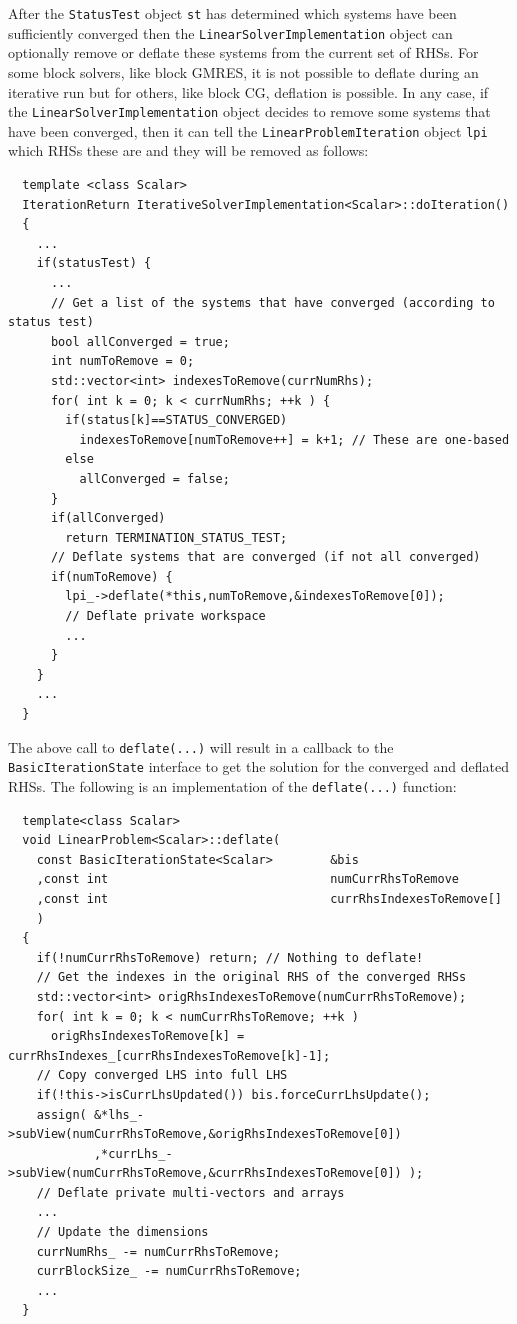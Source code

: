 \documentclass[pdf,ps2pdf,11pt]{SANDreport}
\begin{document}
\begin{enumerate}
After the {}\texttt{Status\-Test} object {}\texttt{st} has determined
which systems have been sufficiently converged then the
{}\texttt{Linear\-Solver\-Implementation} object can optionally remove
or deflate these systems from the current set of RHSs.  For some block
solvers, like block GMRES, it is not possible to deflate during an
iterative run but for others, like block CG, deflation is possible.
In any case, if the {}\texttt{Linear\-Solver\-Implementation} object
decides to remove some systems that have been converged, then it can
tell the {}\texttt{Linear\-Problem\-Iteration} object {}\texttt{lpi}
which RHSs these are and they will be removed as follows:

{\scriptsize\begin{verbatim}
  template <class Scalar>
  IterationReturn IterativeSolverImplementation<Scalar>::doIteration()
  {
    ...
    if(statusTest) {
      ...
      // Get a list of the systems that have converged (according to status test)
      bool allConverged = true;
      int numToRemove = 0;
      std::vector<int> indexesToRemove(currNumRhs);
      for( int k = 0; k < currNumRhs; ++k ) {
        if(status[k]==STATUS_CONVERGED)
          indexesToRemove[numToRemove++] = k+1; // These are one-based
        else
          allConverged = false;
      }
      if(allConverged)
        return TERMINATION_STATUS_TEST;
      // Deflate systems that are converged (if not all converged)
      if(numToRemove) {
        lpi_->deflate(*this,numToRemove,&indexesToRemove[0]);
        // Deflate private workspace
        ...
      }
    }
    ...
  }
\end{verbatim}}

The above call to {}\texttt{deflate(...)} will result in a callback to
the {}\texttt{Basic\-Iteration\-State} interface to get the solution
for the converged and deflated RHSs.  The following is an
implementation of the {}\texttt{deflate(...)} function:

{\scriptsize\begin{verbatim}
  template<class Scalar>
  void LinearProblem<Scalar>::deflate(
    const BasicIterationState<Scalar>        &bis
    ,const int                               numCurrRhsToRemove
    ,const int                               currRhsIndexesToRemove[]
    )
  {
    if(!numCurrRhsToRemove) return; // Nothing to deflate!
    // Get the indexes in the original RHS of the converged RHSs
    std::vector<int> origRhsIndexesToRemove(numCurrRhsToRemove);
    for( int k = 0; k < numCurrRhsToRemove; ++k )
      origRhsIndexesToRemove[k] = currRhsIndexes_[currRhsIndexesToRemove[k]-1];
    // Copy converged LHS into full LHS
    if(!this->isCurrLhsUpdated()) bis.forceCurrLhsUpdate();
    assign( &*lhs_->subView(numCurrRhsToRemove,&origRhsIndexesToRemove[0])
            ,*currLhs_->subView(numCurrRhsToRemove,&currRhsIndexesToRemove[0]) );
    // Deflate private multi-vectors and arrays
    ...
    // Update the dimensions
    currNumRhs_ -= numCurrRhsToRemove;
    currBlockSize_ -= numCurrRhsToRemove;
    ...
  }
\end{verbatim}}


\end{enumerate}
\end{document}
